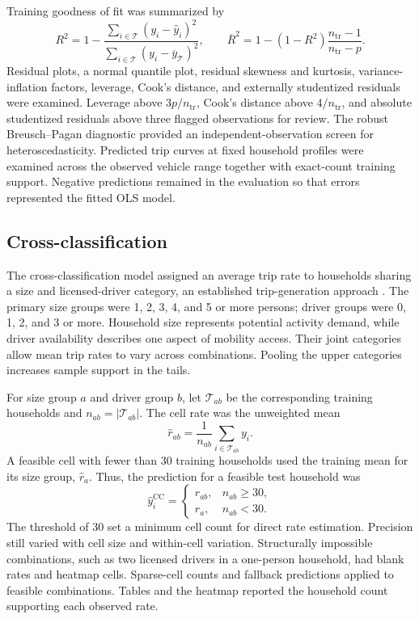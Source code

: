 Training goodness of fit was summarized by
\begin{equation}
 R^2=1-\frac{\sum_{i\in\mathcal T}(y_i-\widehat y_i)^2}
                 {\sum_{i\in\mathcal T}(y_i-\overline y_{\mathcal T})^2},
 \qquad
 \overline R^2=1-(1-R^2)\frac{n_{\mathrm{tr}}-1}{n_{\mathrm{tr}}-p}.
\end{equation}
Residual plots, a normal quantile plot, residual skewness and kurtosis, variance-inflation factors, leverage, Cook's distance, and externally studentized residuals were examined. Leverage above $3p/n_{\mathrm{tr}}$, Cook's distance above $4/n_{\mathrm{tr}}$, and absolute studentized residuals above three flagged observations for review. The robust Breusch--Pagan diagnostic provided an independent-observation screen for heteroscedasticity. Predicted trip curves at fixed household profiles were examined across the observed vehicle range together with exact-count training support. Negative predictions remained in the evaluation so that errors represented the fitted OLS model.

\subsection{Cross-classification}
The cross-classification model assigned an average trip rate to households sharing a size and licensed-driver category, an established trip-generation approach \cite{Moeckel2017}. The primary size groups were 1, 2, 3, 4, and 5 or more persons; driver groups were 0, 1, 2, and 3 or more. Household size represents potential activity demand, while driver availability describes one aspect of mobility access. Their joint categories allow mean trip rates to vary across combinations. Pooling the upper categories increases sample support in the tails.

For size group $a$ and driver group $b$, let $\mathcal T_{ab}$ be the corresponding training households and $n_{ab}=|\mathcal T_{ab}|$. The cell rate was the unweighted mean
\begin{equation}
 \widehat r_{ab}=\frac{1}{n_{ab}}\sum_{i\in\mathcal T_{ab}}y_i.
\end{equation}
A feasible cell with fewer than 30 training households used the training mean for its size group, $\widehat r_a$. Thus, the prediction for a feasible test household was
\begin{equation}
 \widehat y_i^{\mathrm{CC}}=
 \begin{cases}
 \widehat r_{ab}, & n_{ab}\geq30,\\
 \widehat r_a, & n_{ab}<30.
 \end{cases}
\end{equation}
The threshold of 30 set a minimum cell count for direct rate estimation. Precision still varied with cell size and within-cell variation. Structurally impossible combinations, such as two licensed drivers in a one-person household, had blank rates and heatmap cells. Sparse-cell counts and fallback predictions applied to feasible combinations. Tables and the heatmap reported the household count supporting each observed rate.

